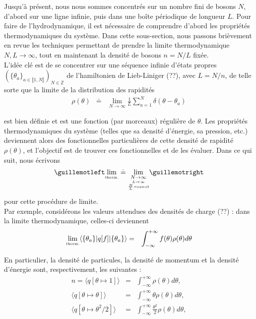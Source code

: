 Jusqu'à présent, nous nous sommes concentrés sur un nombre fini de bosons $N$, d'abord sur une ligne infinie, puis dans une boîte périodique de longueur $L$. Pour faire de l'hydrodynamique, il est nécessaire de comprendre d'abord les propriétés thermodynamiques du système. Dans cette sous-section, nous passons brièvement en revue les techniques permettant de prendre la limite thermodynamique $N, L \to \infty$, tout en maintenant la densité de bosons $n = N/L$ fixée.\\

L'idée clé est de se concentrer sur une séquence infinie d'états propres $(\{\theta_a\}_{ a \in \llbracket 1 , N \rrbracket} )_{ N \in \mathbb{Z}}$ de l'hamiltonien de Lieb-Liniger (??), avec $L = N/n$, de telle sorte que la limite de la distribution des rapidités
\begin{eqnarray}
	\rho(\theta) & \doteq & \underset{N \to \infty}{\lim} \frac{1}{L} \sum_{a = 1 }^N \delta ( \theta - \theta_a)
\end{eqnarray}

est bien définie et est une fonction (par morceaux) régulière de $\theta$. Les propriétés thermodynamiques du système (telles que sa densité d'énergie, sa pression, etc.) deviennent alors des fonctionnelles particulières de cette densité de rapidité $\rho( \theta ) $, et l'objectif est de trouver ces fonctionnelles et de les évaluer. Dans ce qui suit, nous écrivons $$\guillemotleft \underset{\tiny \mbox{therm.}}{\lim} \doteq \underset{\underset{\underset{\frac{N}{L} = const}{L \to \infty }}{N \to \infty}}{\lim}\guillemotright$$ pour cette procédure de limite.\\

Par exemple, considérons les valeurs attendues des densités de charge (??) : dans la limite thermodynamique, celles-ci deviennent
\begin{eqnarray}
	\underset{\tiny \mbox{therm.}}{\lim} \langle \{ \theta_a \} \vert q[f] \vert \{ \theta_a \} \rangle & = & \int_{-\infty}^{+\infty}  f(\theta) \rho ( \theta )  d\theta 	
\end{eqnarray}

En particulier, la densité de particules, la densité de momentum et la densité d'énergie sont, respectivement, les suivantes :
\begin{eqnarray*}
	n = \langle q[\theta \mapsto 1] \rangle & = & 	\int_{-\infty}^{+\infty} \rho ( \theta )  d\theta, \\
	\langle q[\theta \mapsto \theta] \rangle & = & 	\int_{-\infty}^{+\infty} \theta \rho ( \theta )  d\theta,\\
	\langle q[\theta \mapsto \theta^2 /2 ] \rangle & = & 	\int_{-\infty}^{+\infty} \frac{\theta^2}{2} \rho ( \theta )  d\theta,
\end{eqnarray*}

